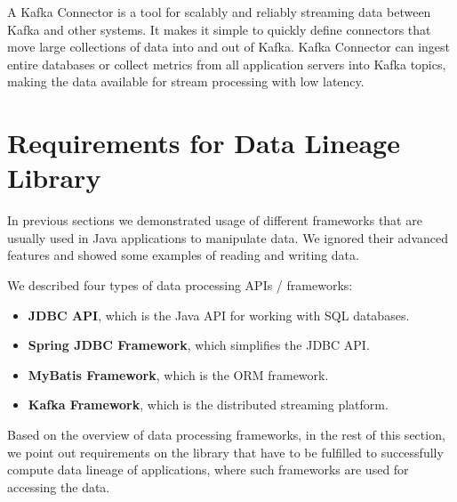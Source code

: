 A Kafka Connector is a tool for scalably and reliably streaming data between Kafka
and other systems. It makes it simple to quickly define connectors that move
large collections of data into and out of Kafka.
Kafka Connector can ingest entire databases or collect metrics from all
application servers into Kafka topics, making the data available
for stream processing with low latency.




\section{Requirements for Data Lineage Library \label{frameworks:requirements}}

In previous sections we demonstrated usage of different frameworks
that are usually used in Java applications to manipulate data.
We ignored their advanced features and showed some examples of reading
and writing data.

We described four types of data processing APIs / frameworks:
\begin{itemize}
  \item \textbf{JDBC API}, which is the Java API for working with SQL databases.
  \item \textbf{Spring JDBC Framework}, which simplifies the JDBC API.
  \item \textbf{MyBatis Framework}, which is the ORM framework.
  \item \textbf{Kafka Framework}, which is the distributed streaming platform.
\end{itemize}

Based on the overview of data processing frameworks,
in the rest of this section, we point out requirements on the library that
have to be fulfilled to successfully compute data lineage of applications,
where such frameworks are used for accessing the data.

